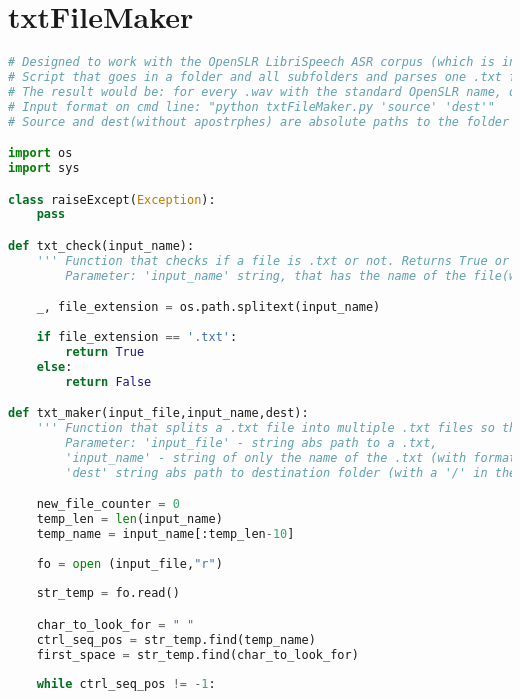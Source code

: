 \section{txtFileMaker}
\begin{lstlisting}[language=Python, flexiblecolumns=true, caption=txtFileMaker code.]
# Designed to work with the OpenSLR LibriSpeech ASR corpus (which is in .flac)
# Script that goes in a folder and all subfolders and parses one .txt file containg paragraphs to multiple .txt files corresponding to their .wav files
# The result would be: for every .wav with the standard OpenSLR name, one .txt file with the same name as the .wav (audio corresponds to the paragraph)
# Input format on cmd line: "python txtFileMaker.py 'source' 'dest'"         
# Source and dest(without apostrphes) are absolute paths to the folder containing the unsplit .txt files and the folder where the converted .flac to .wav files are respecively 

import os
import sys

class raiseExcept(Exception):
    pass

def txt_check(input_name):
    ''' Function that checks if a file is .txt or not. Returns True or False (bool)
        Parameter: 'input_name' string, that has the name of the file(with format). It may work with absolute path and name (maybe) '''    

    _, file_extension = os.path.splitext(input_name)
        
    if file_extension == '.txt':   
        return True
    else:
        return False

def txt_maker(input_file,input_name,dest):
    ''' Function that splits a .txt file into multiple .txt files so that the .wav files and .txt files are 1 to 1 pairs. 
        Parameter: 'input_file' - string abs path to a .txt, 
        'input_name' - string of only the name of the .txt (with format), 
        'dest' string abs path to destination folder (with a '/' in the end!) '''    

    new_file_counter = 0
    temp_len = len(input_name)
    temp_name = input_name[:temp_len-10]
    
    fo = open (input_file,"r")
    
    str_temp = fo.read()

    char_to_look_for = " "
    ctrl_seq_pos = str_temp.find(temp_name)
    first_space = str_temp.find(char_to_look_for)
        
    while ctrl_seq_pos != -1:
        

\end{lstlisting}
